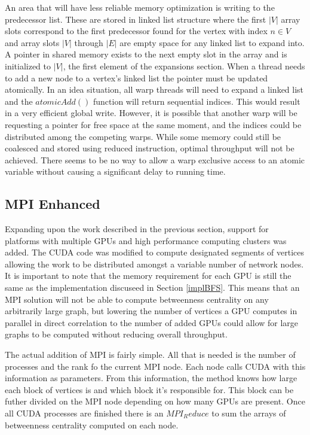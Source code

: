 \documentclass[10pt,twocolumn]{article}
\begin{document}
An area that will have less reliable memory optimization is writing to the predecessor list. These are stored in linked list structure where the first $|V|$ array slots correspond to the first predecessor found for the vertex with index $n \in V$ and array slots $|V|$ through $|E|$ are empty space for any linked list to expand into. A pointer in shared memory exists to the next empty slot in the array and is initialized to $|V|$, the first element of the expansions section. When a thread needs to add a new node to a vertex's linked list the pointer must be updated atomically. In an idea situation, all warp threads will need to expand a linked list and the $atomicAdd()$ function will return sequential indices. This would result in a very efficient global write. However, it is possible that another warp will be requesting a pointer for free space at the same moment, and the indices could be distributed among the competing warps. While some memory could still be coalesced and stored using reduced instruction, optimal throughput will not be achieved. There seems to be no way to allow a warp exclusive access to an atomic variable without causing a significant delay to running time.

\subsection{MPI Enhanced}
Expanding upon the work described in the previous section, support for platforms with multiple GPUs and high performance computing clusters was added. The CUDA code was modified to compute designated segments of vertices allowing the work to be distributed amongst a variable number of network nodes. It is important to note that the memory requirement for each GPU is still the same as the implementation discuseed in Section \ref{implBFS}. This means that an MPI solution will not be able to compute betweenness centrality on any arbitrarily large graph, but lowering the number of vertices a GPU computes in parallel in direct correlation to the number of added GPUs could allow for large graphs to be computed without reducing overall throughput.

The actual addition of MPI is fairly simple. All that is needed is the number of processes and the rank fo the current MPI node. Each node calls CUDA with this information as parameters. From this information, the method knows how large each block of vertices is and which block it's responsible for. This block can be futher divided on the MPI node depending on how many GPUs are present. Once all CUDA processes are finished there is an $MPI_Reduce$ to sum the arrays of betweenness centrality computed on each node.
\end{document}
